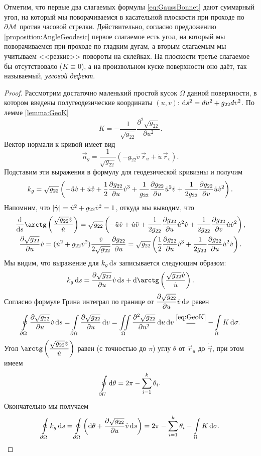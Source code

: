 Отметим, что первые два слагаемых формулы \eqref{eq:GaussBonnet} дают суммарный угол, на который мы поворачиваемся в касательной плоскости при проходе по $\partial \mathcal{M}$ против часовой стрелки. Действительно, согласно предложению \ref{proposition:AngleGeodesic} первое слагаемое есть угол, на который мы поворачиваемся при проходе по гладким дугам, а вторым слагаемым мы учитываем <<резкие>> повороты на склейках. На плоскости третье слагаемое бы отсутствовало ($K \equiv 0$), а на произвольном куске поверхности оно даёт, так называемый, \textit{угловой дефект}.

\begin{proof}
	Рассмотрим достаточно маленький простой кусок $\Omega$ данной поверхности, в котором введены полугеодезические координаты $(u, v)$: $\mathop{}\!\mathrm{d} s^2 = du^2 + g_{22}dv^2$. По лемме \ref{lemma:GeoK}
	\[
		K = -\frac{1}{\sqrt{g_{22}}}\frac{\partial^2\sqrt{g_{22}}}{\partial u^2}.
	\]
	Вектор нормали к кривой имеет вид
	\[
		\vec{n}_g = \frac{1}{\sqrt{g_{22}}}(-g_{22}\dot{v}\,\vec{r}_u + \dot{u}\,\vec{r}_v).
	\]
	Подставим эти выражения в формулу для геодезической кривизны и получим
	\[
		k_g = \sqrt{g_{22}}\left(-\ddot{u}\dot{v} + \dot{u}\ddot{v} + \frac{1}{2}\frac{\partial g_{22}}{\partial u}\dot{v}^3 + \frac{1}{g_{22}}\frac{\partial g_{22}}{\partial u}\dot{u}^2\dot{v} + \frac{1}{2g_{22}}\frac{\partial g_{22}}{\partial v}\dot{u}\dot{v}^2\right).
	\]
	Напомним, что $\left\lvert\dot{\boldsymbol{\gamma}}\right\rvert = \dot{u}^2 + g_{22}\dot{v}^2 = 1$, откуда мы выводим, что
	\begin{gather*}
		\frac{\d}{\d s}\arctg\br{\frac{\sqrt{g_{22}}\dot{v}}{\dot{u}}} = \sqrt{g_{22}}\br{-\ddot{u}\dot{v} + \dot{u}\ddot{v} + \frac{1}{2g_{22}}\frac{\partial g_{22}}{\partial u}\dot{u}^2\dot{v} + \frac{1}{2g_{22}}\frac{\partial g_{22}}{\partial v}\dot{u}\dot{v}^2},\\
		\frac{\partial\sqrt{g_{22}}}{\partial u}\dot{v} = (\dot{u}^2 + g_{22}\dot{v}^2)\frac{\dot{v}}{2\sqrt{g_{22}}}\frac{\partial g_{22}}{\partial u} = \sqrt{g_{22}}\br{\frac{1}{2}\frac{\partial g_{22}}{\partial u}\dot{v}^3 + \frac{1}{2g_{22}}\frac{\partial g_{22}}{\partial u}\dot{u}^2\dot{v}}.
	\end{gather*}
	Мы видим, что выражение для $k_g\mathop{}\!\mathrm{d} s$ записывается следующим образом:
	\[
		k_g\d s = \frac{\partial\sqrt{g_{22}}}{\partial u}\dot{v}\d s + \d\arctg\br{\frac{\sqrt{g_{22}}\dot{v}}{\dot{u}}}.
	\]
	Согласно формуле Грина интеграл по границе от $\displaystyle\frac{\partial\sqrt{g_{22}}}{\partial u}\dot{v}\mathop{}\!\mathrm{d} s$ равен
	\[
		\oint\limits_{\partial \Omega}\frac{\partial\sqrt{g_{22}}}{\partial u}\dot{v}\d s = \int\limits_{\partial \Omega}\frac{\partial\sqrt{g_{22}}}{\partial u}\d v = \iint\limits_{\Omega}\frac{\partial^2\sqrt{g_{22}}}{\partial u^2}\d u\d v \stackrel{\eqref{eq:GeoK}}{=\joinrel=} -\int\limits_{\Omega}K\d\sigma.
	\]
	Угол $\ds\arctg\br{\frac{\sqrt{g_{22}}\dot{v}}{\dot{u}}}$ равен (с точностью до $\pi$) углу $\theta$ от $\vec{r}_u$ до $\dot{\vec{\gamma}}$, при этом имеем
	\[
		\oint\limits_{\partial U}\mathop{}\!\mathrm{d}\theta = 2\pi - \sum_{i = 1}^k\theta_i.
	\]
	Окончательно мы получаем
	\[
		\oint\limits_{\partial \Omega}k_g\mathop{}\!\mathrm{d} s = \oint\limits_{\partial \Omega}\left(\mathop{}\!\mathrm{d}\theta + \frac{\partial\sqrt{g_{22}}}{\partial u}\dot{v}\mathop{}\!\mathrm{d} s\right) = 2\pi - \sum_{i = 1}^k\theta_i - \int\limits_{\Omega}K\mathop{}\!\mathrm{d}\sigma.
	\]
	

\end{proof}
